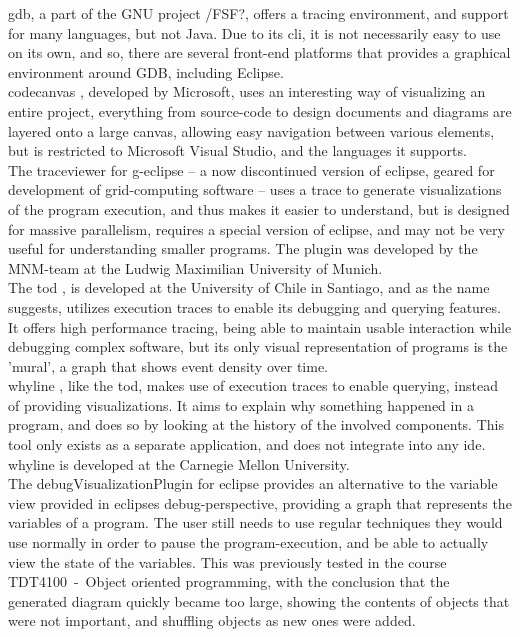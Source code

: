 \gls{gdb}, a part of the GNU project /FSF?, offers a tracing environment, and support for many languages, but not Java.
Due to its \gls{cli}, it is not necessarily easy to use on its own, and so, there are several front-end platforms that provides a graphical environment around GDB, including Eclipse.
~\\

\Gls{codecanvas} \cite{Deline2010}, developed by Microsoft, uses an interesting way of visualizing an entire project, everything from source-code to design documents and diagrams are layered onto a large canvas, allowing easy navigation between various elements, but is restricted to Microsoft Visual Studio, and the languages it supports.
~\\

The \gls{traceviewer} \cite{Thomas2010} for g-eclipse -- a now discontinued version of eclipse, geared for development of grid-computing software -- uses a trace to generate visualizations of the program execution, and thus makes it easier to understand, but is designed for massive parallelism, requires a special version of eclipse, and may not be very useful for understanding smaller programs.
The plugin was developed by the MNM-team at the Ludwig Maximilian University of Munich.
~\\

The \gls{tod} \cite{Pothier2007}, is developed at the University of Chile in Santiago, and as the name suggests, utilizes execution traces to enable its debugging and querying features.
It offers high performance tracing, being able to maintain usable interaction while debugging complex software, but its only visual representation of programs is the 'mural', a graph that shows event density over time.
~\\

\Gls{whyline} \cite{ko2009}, like the \gls{tod}, makes use of execution traces to enable querying, instead of providing visualizations.
It aims to explain why something happened in a program, and does so by looking at the history of the involved components.
This tool only exists as a separate application, and does not integrate into any \gls{ide}.
\Gls{whyline} is developed at the Carnegie Mellon University.
~\\

The \gls{debugVisualizationPlugin} for eclipse provides an alternative to the variable view provided in eclipses debug-perspective, providing a graph that represents the variables of a program.
The user still needs to use regular techniques they would use normally in order to pause the program-execution, and be able to actually view the state of the variables.
This was previously tested in the course TDT4100~-~Object oriented programming, with the conclusion that the generated diagram quickly became too large, showing the contents of objects that were not important, and shuffling objects as new ones were added.%
~\\

